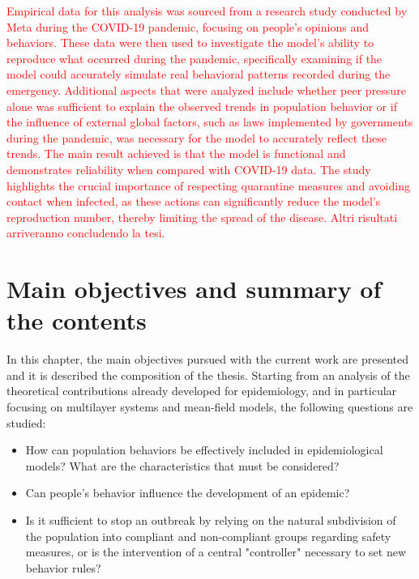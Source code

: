 \textcolor{red}{Empirical data for this analysis was sourced from a research study conducted by Meta during the COVID-19 pandemic, focusing on people's opinions and behaviors.
These data were then used to investigate the model's ability to reproduce what occurred during the pandemic, specifically examining if the model could accurately simulate real behavioral patterns recorded during the emergency.
Additional aspects that were analyzed include whether peer pressure alone was sufficient to explain the observed trends in population behavior or if the influence of external global factors, such as laws implemented by governments during the pandemic, was necessary for the model to accurately reflect these trends.}
\textcolor{red}{The main result achieved is that the model is functional and demonstrates reliability when compared with COVID-19 data. The study highlights the crucial importance of respecting quarantine measures and avoiding contact when infected, as these actions can significantly reduce the model's reproduction number, thereby limiting the spread of the disease. Altri risultati arriveranno concludendo la tesi.}

\chapter{Main objectives and summary of the contents}

In this chapter, the main objectives pursued with the current work are presented and it is described the composition of the thesis. 
Starting from an analysis of the theoretical contributions already developed for epidemiology, and in particular focusing on multilayer systems and mean-field models, the following questions are studied:

\begin{itemize}
	\item How can population behaviors be effectively included in epidemiological models? What are the characteristics that must be considered?
	\item Can people's behavior influence the development of an epidemic?
	\item Is it sufficient to stop an outbreak by relying on the natural subdivision of the population into compliant and non-compliant groups regarding safety measures, or is the intervention of a central "controller" necessary to set new behavior rules?
\end{itemize}

